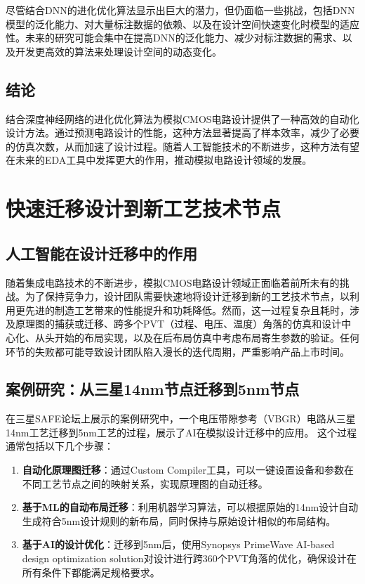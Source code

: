 尽管结合DNN的进化优化算法显示出巨大的潜力，但仍面临一些挑战，包括DNN模型的泛化能力、对大量标注数据的依赖、以及在设计空间快速变化时模型的适应性。未来的研究可能会集中在提高DNN的泛化能力、减少对标注数据的需求、以及开发更高效的算法来处理设计空间的动态变化。\cite{9104667}

\subsection{结论}

结合深度神经网络的进化优化算法为模拟CMOS电路设计提供了一种高效的自动化设计方法。通过预测电路设计的性能，这种方法显著提高了样本效率，减少了必要的仿真次数，从而加速了设计过程。随着人工智能技术的不断进步，这种方法有望在未来的EDA工具中发挥更大的作用，推动模拟电路设计领域的发展。

\section{快速迁移设计到新工艺技术节点}

\subsection{人工智能在设计迁移中的作用}

随着集成电路技术的不断进步，模拟CMOS电路设计领域正面临着前所未有的挑战。为了保持竞争力，设计团队需要快速地将设计迁移到新的工艺技术节点，以利用更先进的制造工艺带来的性能提升和功耗降低。然而，这一过程复杂且耗时，涉及原理图的捕获或迁移、跨多个PVT（过程、电压、温度）角落的仿真和设计中心化、从头开始的布局实现，以及在后布局仿真中考虑布局寄生参数的验证。任何环节的失败都可能导致设计团队陷入漫长的迭代周期，严重影响产品上市时间。

\subsection{案例研究：从三星14nm节点迁移到5nm节点}

在三星SAFE论坛上展示的案例研究中，一个电压带隙参考（VBGR）电路从三星14nm工艺迁移到5nm工艺的过程，展示了AI在模拟设计迁移中的应用。\cite{synopsys20231102}
这个过程通常包括以下几个步骤：

\begin{enumerate}
    \item \textbf{自动化原理图迁移}：通过Custom Compiler工具，可以一键设置设备和参数在不同工艺节点之间的映射关系，实现原理图的自动迁移。
    \item \textbf{基于ML的自动布局迁移}：利用机器学习算法，可以根据原始的14nm设计自动生成符合5nm设计规则的新布局，同时保持与原始设计相似的布局结构。
    \item \textbf{基于AI的设计优化}：迁移到5nm后，使用Synopsys PrimeWave AI-based design optimization solution对设计进行跨360个PVT角落的优化，确保设计在所有条件下都能满足规格要求。
\end{enumerate}

